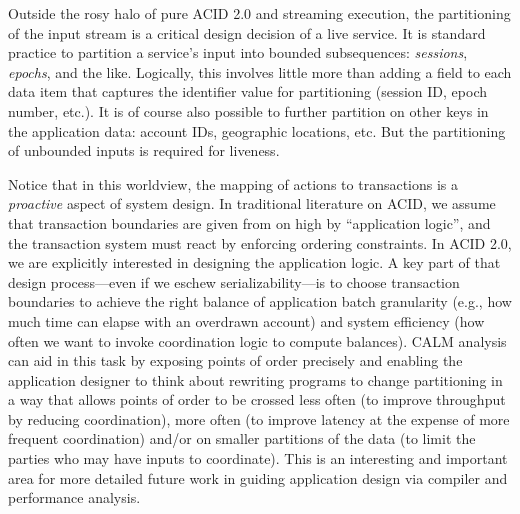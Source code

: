 \documentclass{sig-alternate}
\newcommand{\paa}[1]{{\textcolor{blue}{[[#1 -- paa]]}}}
\begin{document}
Outside the rosy halo of pure ACID 2.0 and streaming execution, the partitioning of the input stream is a critical design decision of a live service. 
It is standard practice to partition a service's input into bounded subsequences: \emph{sessions}, \emph{epochs}, and the like. Logically, this involves little more than adding a field to each data item that captures the identifier value for partitioning (session ID, epoch number, etc.).  
It is of course also possible to further partition on other keys in the application data: account IDs, geographic locations, etc.  But the partitioning of unbounded inputs is required for liveness.

Notice that in this worldview, the mapping of actions to transactions is a \emph{proactive} aspect of system design.  In traditional literature on ACID, we assume that transaction boundaries are given from on high by ``application logic'', and the transaction system must react by enforcing ordering constraints.  In ACID 2.0, we are explicitly interested in designing the application logic.  A key part of that design process---even if we eschew serializability---is to choose transaction boundaries to achieve the right balance of application batch granularity (e.g., how much time can elapse with an overdrawn account) and system efficiency (how often we want to invoke coordination logic to compute balances).  CALM analysis can aid in this task by exposing points of order precisely and enabling the application designer to think about rewriting programs to change partitioning in a way that allows points of order to be crossed less often (to improve throughput by reducing coordination), more often (to improve latency at the expense of more frequent coordination) and/or on smaller partitions of the data (to limit the parties who may have inputs to coordinate).  This is an interesting and important area for more detailed future work in guiding application design via compiler and performance analysis.
\end{document}
